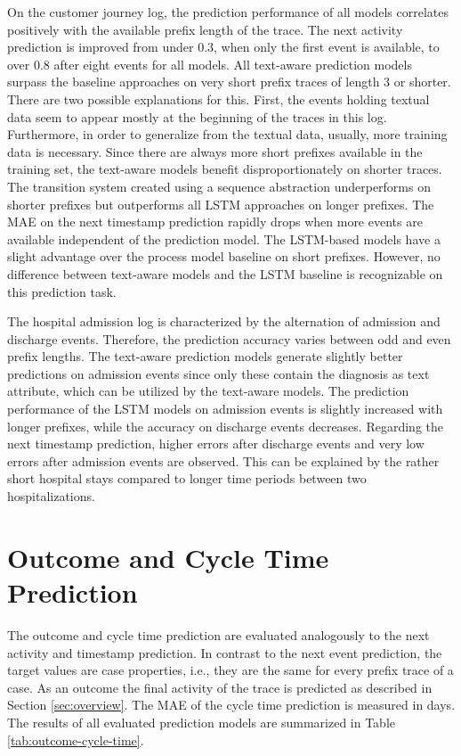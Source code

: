 On the customer journey log, the prediction performance of all models correlates positively with the available prefix length of the trace.
The next activity prediction is improved from under 0.3, when only the first event is available, to over 0.8 after eight events for all models.
All text-aware prediction models surpass the baseline approaches on very short prefix traces of length 3 or shorter.
There are two possible explanations for this.
First, the events holding textual data seem to appear mostly at the beginning of the traces in this log.
Furthermore, in order to generalize from the textual data, usually, more training data is necessary.
Since there are always more short prefixes available in the training set, the text-aware models benefit disproportionately on shorter traces.
The transition system created using a sequence abstraction underperforms on shorter prefixes but outperforms all LSTM approaches on longer prefixes.
The MAE on the next timestamp prediction rapidly drops when more events are available independent of the prediction model.
The LSTM-based models have a slight advantage over the process model baseline on short prefixes.
However, no difference between text-aware models and the LSTM baseline is recognizable on this prediction task.

The hospital admission log is characterized by the alternation of admission and discharge events.
Therefore, the prediction accuracy varies between odd and even prefix lengths.
The text-aware prediction models generate slightly better predictions on admission events since only these contain the diagnosis as text attribute, which can be utilized by the text-aware models.
The prediction performance of the LSTM models on admission events is slightly increased with longer prefixes, while the accuracy on discharge events decreases.
Regarding the next timestamp prediction, higher errors after discharge events and very low errors after admission events are observed.
This can be explained by the rather short hospital stays compared to longer time periods between two hospitalizations.

\section{Outcome and Cycle Time Prediction}

The outcome and cycle time prediction are evaluated analogously to the next activity and timestamp prediction.
In contrast to the next event prediction, the target values are case properties, i.e., they are the same for every prefix trace of a case.
As an outcome the final activity of the trace is predicted as described in Section \ref{sec:overview}.
The MAE of the cycle time prediction is measured in days.
The results of all evaluated prediction models are summarized in Table \ref{tab:outcome-cycle-time}.

